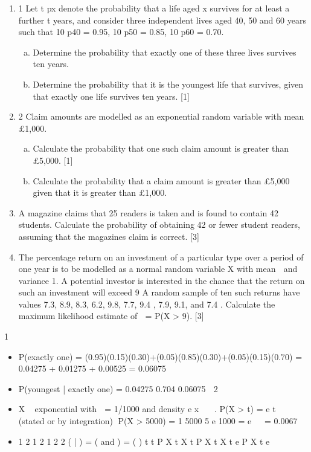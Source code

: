 \documentclass[a4paper,12pt]{article}
\begin{document}
\begin{enumerate}
\begin{enumerate}
\item 1 Let t px denote the probability that a life aged x survives for at least a further t years,
and consider three independent lives aged 40, 50 and 60 years such that
10 p40 = 0.95, 10 p50 = 0.85, 10 p60 = 0.70.
\begin{enumerate}[(a)]
\item Determine the probability that exactly one of these three lives survives ten
years. 
\item Determine the probability that it is the youngest life that survives, given that
exactly one life survives ten years. [1]
\end{enumerate}
\item 2 Claim amounts are modelled as an exponential random variable with mean £1,000.
\begin{enumerate}[(a)]
\item Calculate the probability that one such claim amount is greater than £5,000.
[1]
\item Calculate the probability that a claim amount is greater than £5,000 given that
it is greater than £1,000. 
\end{enumerate}
\item  A magazine claims that 25%
readers is taken and is found to contain 42 students.
Calculate the probability of obtaining 42 or fewer student readers, assuming that the magazines claim is correct. [3]
\item  The percentage return on an investment of a particular type over a period of one year is to be modelled as a normal random variable X with mean  and variance 1. A
potential investor is interested in the chance that the return on such an investment will
exceed 9%
A random sample of ten such returns have values
7.3, 8.9, 8.3, 6.2, 9.8, 7.7, 9.4 , 7.9, 9.1, and 7.4 .
Calculate the maximum likelihood estimate of  = P(X > 9). [3]
\end{enumerate}
1 
\begin{itemize} \item P(exactly one) = (0.95)(0.15)(0.30)+(0.05)(0.85)(0.30)+(0.05)(0.15)(0.70)
= 0.04275 + 0.01275 + 0.00525 = 0.06075
\item P(youngest | exactly one) = 0.04275 0.704
0.06075 
2 \item X ~ exponential with  = 1/1000 and density e x 
 .
P(X > t) = e t  (stated or by integration)
P(X > 5000) =
1 5000 5 e 1000 = e 
 = 0.0067
\item
1
2
1 2
1 2
2
( | ) = ( and ) =
( )
t
t
P X t X t P X t X t e
P X t e


\end{itemize}
\end{enumerate}
\end{document}
